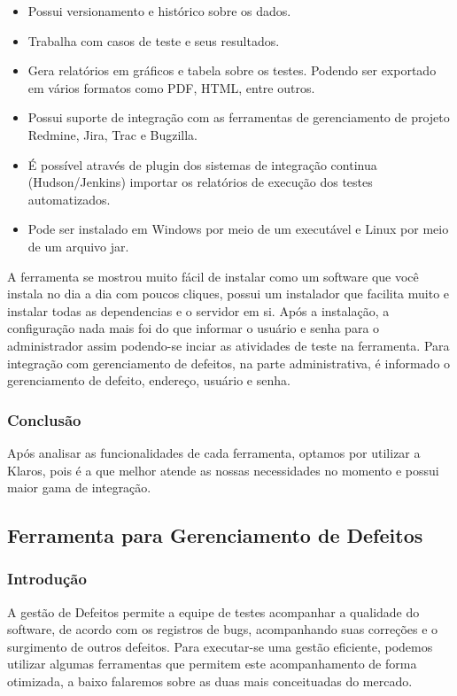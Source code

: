 \documentclass[12pt,a4paper]{article}
\begin{document}
			\begin{itemize}
			  \item Possui versionamento e histórico sobre os dados.
			  \item Trabalha com casos de teste e seus resultados.
			  \item Gera relatórios em gráficos e tabela sobre os testes. Podendo ser exportado em vários formatos como PDF,
			  HTML, entre outros.
			  \item Possui suporte de integração com as ferramentas de gerenciamento de projeto Redmine, Jira, Trac e Bugzilla.
			  \item É possível através de plugin dos sistemas de integração continua (Hudson/Jenkins) importar os relatórios de
			  execução dos testes automatizados.
			  \item Pode ser instalado em Windows por meio de um executável e Linux por meio de um arquivo jar.
			\end{itemize}
			
			A ferramenta se mostrou muito fácil de instalar como um software que você instala no dia a dia com poucos cliques,
			possui um instalador que facilita muito e instalar todas as dependencias e o servidor em si. Após a instalação, a
			configuração nada mais foi do que informar o usuário e senha para o administrador assim podendo-se inciar as
			atividades de teste na ferramenta. Para integração com gerenciamento de defeitos, na parte administrativa, é
			informado o gerenciamento de defeito, endereço, usuário e senha. 
			
		\subsubsection{Conclusão}
			
			Após analisar  as funcionalidades de cada ferramenta, optamos por utilizar a Klaros, pois é a que melhor atende as nossas necessidades no momento e possui maior gama de integração.

	\clearpage		
	\subsection{Ferramenta para Gerenciamento de Defeitos}
	
		\subsubsection{Introdução}
		
			A gestão de Defeitos permite a equipe de testes acompanhar a qualidade do software, 
			de acordo com os registros de bugs, acompanhando suas correções e o surgimento de outros defeitos. 
			Para executar-se uma gestão eficiente, podemos utilizar algumas ferramentas que permitem este acompanhamento de forma otimizada, 
			a baixo falaremos sobre as duas mais conceituadas do mercado.
			
\end{document}
